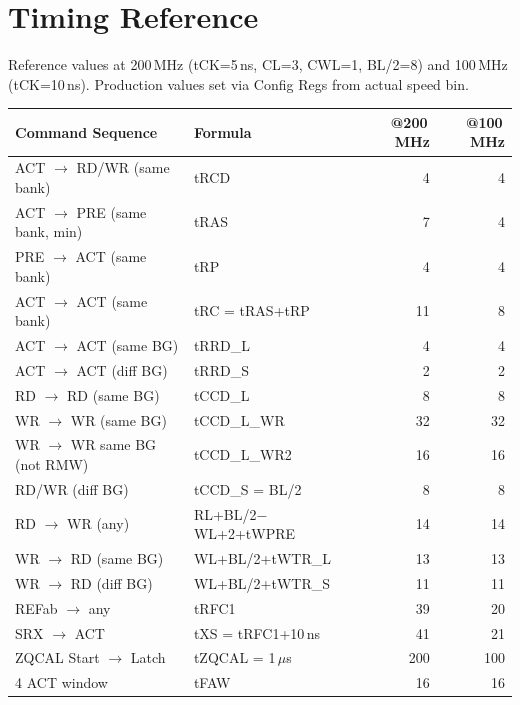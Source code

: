 \documentclass[10pt,a4paper]{article}
\newcommand{\Th}[1]{\cellcolor{cellbg}\textbf{\small #1}}
\newcommand{\RA}{\rowcolor{white}}
\newcommand{\RB}{\rowcolor{altbg}}
\begin{document}
\section{Timing Reference}

Reference values at 200\,MHz (tCK=5\,ns, CL=3, CWL=1, BL/2=8) and 100\,MHz (tCK=10\,ns).
Production values set via Config Regs from actual speed bin.

\begin{center}
\begin{tabularx}{\linewidth}{@{} l l r r @{}}
\toprule
\Th{Command Sequence} & \Th{Formula} & \Th{@200\,MHz} & \Th{@100\,MHz} \\
\midrule
\RA ACT $\to$ RD/WR (same bank) & tRCD & 4 & 4 \\
\RB ACT $\to$ PRE (same bank, min) & tRAS & 7 & 4 \\
\RA PRE $\to$ ACT (same bank) & tRP & 4 & 4 \\
\RB ACT $\to$ ACT (same bank) & tRC = tRAS+tRP & 11 & 8 \\
\RA ACT $\to$ ACT (same BG) & tRRD\_L & 4 & 4 \\
\RB ACT $\to$ ACT (diff BG) & tRRD\_S & 2 & 2 \\
\RA RD $\to$ RD (same BG) & tCCD\_L & 8 & 8 \\
\RB WR $\to$ WR (same BG) & tCCD\_L\_WR & 32 & 32 \\
\RA WR $\to$ WR same BG (not RMW) & tCCD\_L\_WR2 & 16 & 16 \\
\RB RD/WR (diff BG) & tCCD\_S = BL/2 & 8 & 8 \\
\RA RD $\to$ WR (any) & RL+BL/2$-$WL+2+tWPRE & 14 & 14 \\
\RB WR $\to$ RD (same BG) & WL+BL/2+tWTR\_L & 13 & 13 \\
\RA WR $\to$ RD (diff BG) & WL+BL/2+tWTR\_S & 11 & 11 \\
\RB REFab $\to$ any & tRFC1 & 39 & 20 \\
\RA SRX $\to$ ACT & tXS = tRFC1+10\,ns & 41 & 21 \\
\RB ZQCAL Start $\to$ Latch & tZQCAL = 1\,$\mu$s & 200 & 100 \\
\RA 4 ACT window & tFAW & 16 & 16 \\
\bottomrule
\end{tabularx}
\end{center}

\end{document}
